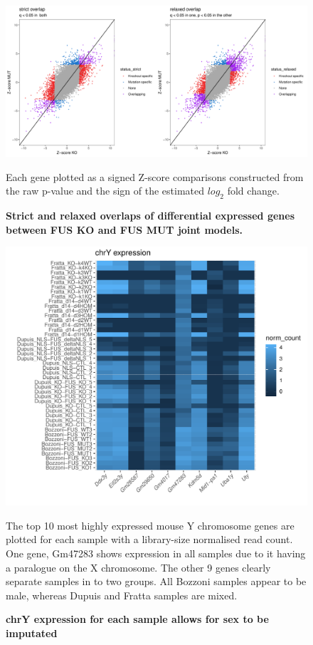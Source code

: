 \begin{appendices}
\begin{figure}[h]
	\centering
	\includegraphics[width=\textwidth]{Figures/06_fus_meta/overlap_type_z_score_plot.pdf}
	\caption{\textbf{Strict and relaxed overlaps of differential expressed genes between FUS KO and FUS MUT joint models.}}
			Each gene plotted as a signed Z-score comparisons constructed from the raw p-value and the sign of the estimated $log_2$ fold change.

	\label{fig:fus_zscore_overlap}
\end{figure}


\begin{figure}
	\centering
	\includegraphics[width=\textwidth]{Figures/06_fus_meta/sex_heatmap.pdf}
	\caption{\textbf{ chrY expression for each sample allows for sex to be imputated } }
	The top 10 most highly expressed mouse Y chromosome genes are plotted for each sample with a library-size normalised read count.
	One gene, Gm47283 shows expression in all samples due to it having a paralogue on the X chromosome. 
	The other 9 genes clearly separate samples in to two groups. 
	All Bozzoni samples appear to be male, whereas Dupuis and Fratta samples are mixed.
	

\end{figure}
\end{appendices}
